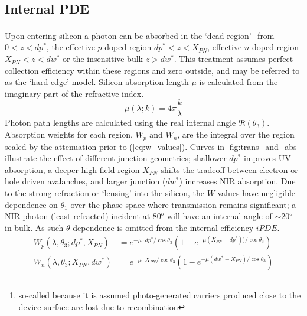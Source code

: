 \subsection{Internal PDE}
\label{sec:internal_pde}
Upon entering silicon a photon can be absorbed in the `dead region'\footnote{so-called because it is assumed photo-generated carriers produced close to the device surface are lost due to recombination} from $0<z<dp^*$, the effective $p$-doped region $dp^*<z<X_{PN}$, effective $n$-doped region $X_{PN}<z<dw^*$ or the insensitive bulk $z > dw^*$. This treatment assumes perfect collection efficiency within these regions and zero outside, and may be referred to as the `hard-edge' model. Silicon absorption length $\mu$ is calculated from the imaginary part of the refractive index.
\begin{equation}
\mu(\lambda; k) = 4 \pi\frac{k}{\lambda}
\label{eq:k_to_mu}
\end{equation}
Photon path lengths are calculated using the real internal angle $\Re(\theta_3)$. Absorption weights for each region, $W_p$ and $W_n$, are the integral over the region scaled by the attenuation prior to (\autoref{eq:w_values}). Curves in \autoref{fig:trans_and_abs} illustrate the effect of different junction geometries; shallower $dp^*$ improves UV absorption, a deeper high-field region $X_{PN}$ shifts the tradeoff between electron or hole driven avalanches, and larger junction ($dw^*$) increases NIR absorption. Due to the strong refraction or `lensing' into the silicon, the $W$ values have negligible dependence on $\theta_1$ over the phase space where transmission remains significant; a NIR photon (least refracted) incident at $80^o$ will have an internal angle of $\sim 20^o$ in bulk. As such $\theta$ dependence is omitted from the internal efficiency $iPDE$.
\begin{align}
    \label{eq:w_values}
    W_p(\lambda, \theta_3; dp^*, X_{PN}) &= e^{-\mu \cdot dp^* / \cos\theta_3}(1-e^{-\mu (X_{PN} - dp^*))/\cos\theta_3}) \\
    W_n(\lambda, \theta_3; X_{PN}, dw^*) &= e^{-\mu \cdot X_{PN} / \cos\theta_3}(1-e^{-\mu (dw^* - X_{PN})/\cos\theta_3})
\end{align}

